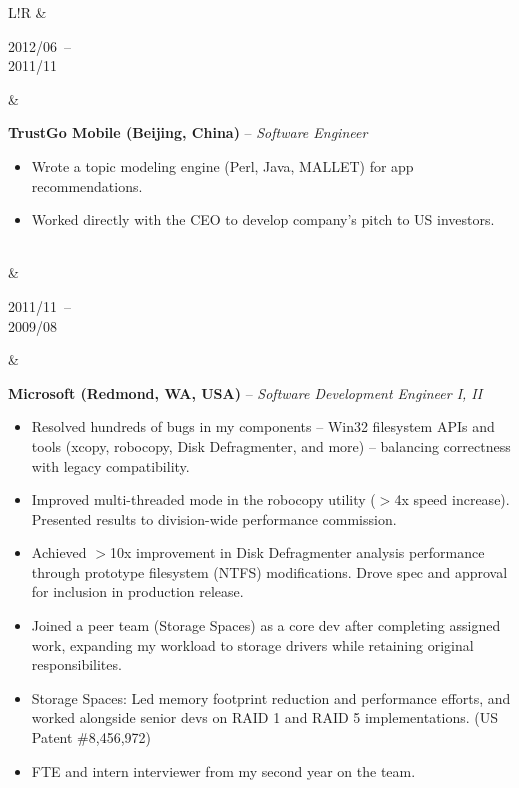 \documentclass[10pt]{article}
\newcommand\VRule{\color{lightgray}\vrule width 0.5pt}
\def\spaceBetweenExperienceEntries{\vspace{8pt}&\vspace{8pt}\\}
\def\spaceBeforeExperienceBullets{\vspace{-10pt}}
\begin{document}
\begin{CJK}{UTF8}{gbsn}
\begin{tabular}{L!{\VRule}R}
    \spaceBetweenExperienceEntries

    \parbox[t]{1.0\linewidth}{
        {\scriptsize 2012/06}~--\\
        {\scriptsize 2011/11}
    }&
    \parbox[t]{1.0\linewidth}{
        {\bf TrustGo Mobile (Beijing, China)} -- \textit{Software Engineer}\\
        \spaceBeforeExperienceBullets
        \begin{itemize}[leftmargin=16pt]
            \item Wrote a topic modeling engine (Perl, Java, MALLET) for app recommendations.
            \item Worked directly with the CEO to develop company's pitch to US investors.
        \end{itemize}
    }\\

    \spaceBetweenExperienceEntries

    \parbox[t]{1.0\linewidth}{
        {\scriptsize 2011/11}~--\\
        {\scriptsize 2009/08}
    }&
    \parbox[t]{1.0\linewidth}{
        {\bf Microsoft (Redmond, WA, USA)} -- \textit{Software Development Engineer I, II}\\
        \spaceBeforeExperienceBullets
        \begin{itemize}[leftmargin=16pt]
            \item Resolved hundreds of bugs in my components -- Win32 filesystem APIs and tools (xcopy, robocopy, Disk Defragmenter, and more) -- balancing correctness with legacy compatibility.
            \item Improved multi-threaded mode in the robocopy utility ($>$4x speed increase). Presented results to division-wide performance commission.
            \item Achieved $>$10x improvement in Disk Defragmenter analysis performance through prototype filesystem (NTFS) modifications. Drove spec and approval for inclusion in production release.
            \item Joined a peer team (Storage Spaces) as a core dev after completing assigned work, expanding my workload to storage drivers while retaining original responsibilites.
            \item Storage Spaces: Led memory footprint reduction and performance efforts, and worked alongside senior devs on RAID 1 and RAID 5 implementations. (US Patent \#8,456,972)
            \item FTE and intern interviewer from my second year on the team.
        \end{itemize}
    }\\


\end{tabular}
\end{CJK}
\end{document}
